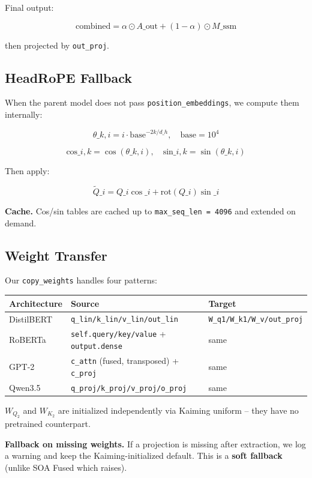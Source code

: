 Final output:

\[
\text{combined} = \alpha \odot A\_\text{out} + (1 - \alpha) \odot M\_\text{ssm}
\tag{4.11}
\]

then projected by \texttt{out\_proj}.

\subsection{HeadRoPE Fallback}

When the parent model does not pass \texttt{position\_embeddings}, we compute them 
internally:

\[
\theta\_{k, i} = i \cdot \text{base}^{-2k/d\_h}, \quad \text{base} = 10^4
\tag{4.12}
\]

\[
\text{cos}\_{i, k} = \cos(\theta\_{k, i}), \quad \text{sin}\_{i, k} = \sin(\theta\_{k, i})
\tag{4.13}
\]

Then apply:

\[
\tilde{Q}\_i = Q\_i \cos\_i + \text{rot}(Q\_i) \sin\_i
\tag{4.14}
\]

\textbf{Cache.} Cos/sin tables are cached up to \texttt{max\_seq\_len = 4096} and extended 
on demand.

\subsection{Weight Transfer}

Our \texttt{copy\_weights} handles four patterns:

\begin{table}[H]
\centering
\small
\begin{tabular}{lll}
\toprule
\textbf{Architecture} & \textbf{Source} & \textbf{Target} \\
\midrule
DistilBERT & \texttt{q\_lin/k\_lin/v\_lin/out\_lin} & \texttt{W\_q1/W\_k1/W\_v/out\_proj} \\
RoBERTa & \texttt{self.query/key/value} + \texttt{output.dense} & same \\
GPT-2 & \texttt{c\_attn} (fused, transposed) + \texttt{c\_proj} & same \\
Qwen3.5 & \texttt{q\_proj/k\_proj/v\_proj/o\_proj} & same \\
\bottomrule
\end{tabular}
\end{table}

$W_{Q_2}$ and $W_{K_2}$ are initialized independently via Kaiming uniform -- 
they have no pretrained counterpart.

\textbf{Fallback on missing weights.} If a projection is missing after extraction, 
we log a warning and keep the Kaiming-initialized default. This is a 
\textbf{soft fallback} (unlike SOA Fused which raises).

